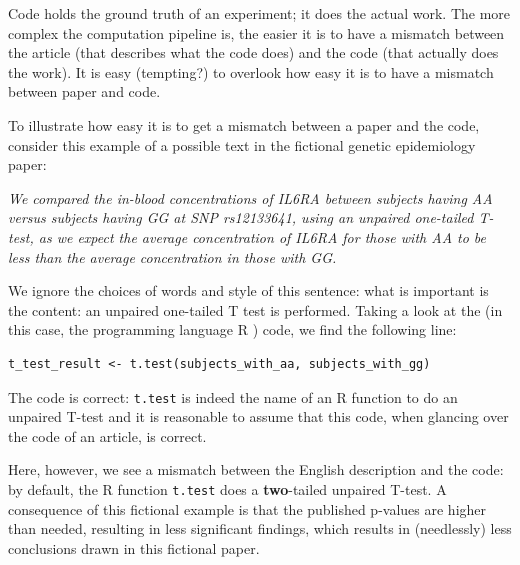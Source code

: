 Code holds the ground truth of an experiment; it does the actual work.
The more complex the computation pipeline is, the easier it is
to have a mismatch between the article (that describes what the
code does) and the code (that actually does the work).
It is easy (tempting?) to overlook how easy it is to have a mismatch
between paper and code.

To illustrate how easy it is to get a mismatch between a paper
and the code, 
consider this example of a possible text in the fictional 
genetic epidemiology paper:

\textit{
We compared the in-blood concentrations of IL6RA 
between subjects having AA versus subjects having GG at SNP rs12133641,
using an unpaired one-tailed T-test,
as we expect the average concentration of IL6RA for those with AA 
to be less than the average concentration in those with GG.
}

We ignore the choices of words and style of this sentence: what is
important is the content: an unpaired one-tailed T test is performed.
Taking a look at the (in this case, the programming language R \cite{r}) code, 
we find the following line:

\begin{verbatim}
t_test_result <- t.test(subjects_with_aa, subjects_with_gg)
\end{verbatim}

The code is correct:
\verb|t.test| is indeed the name of an R function to do an unpaired T-test
and it is reasonable to assume that this code, when glancing over the code
of an article, is correct.

Here, however, we see a mismatch between the English description and the code:
by default, the R function \verb|t.test| does 
a \textbf{two}-tailed unpaired T-test.
A consequence of this fictional example is that the published p-values are
higher than needed, resulting in less significant findings, which
results in (needlessly) less conclusions drawn in this fictional paper.

